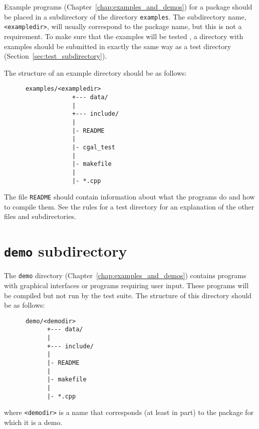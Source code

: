 Example programs (Chapter~\ref{chap:examples_and_demos}) for a package should 
be placed in a subdirectory of the directory {\tt examples}. 
The subdirectory name, \verb|<exampledir>|, will usually correspond to the 
package name, but this is not a requirement.
To make sure that the examples will be tested%
, 
a directory with examples 
should be submitted in exactly the same way as a test directory 
(Section~\ref{sec:test_subdirectory}). 

The structure of an example directory should be as follows: 
\begin{verbatim}
      examples/<exampledir>
                   +--- data/
                   |
                   +--- include/
                   |
                   |- README
                   |
                   |- cgal_test
                   |
                   |- makefile
                   |
                   |- *.cpp
\end{verbatim}

The file {\tt README} should contain information about what the programs do
and how to compile them. 
See the rules for a test directory for an explanation of the other files 
and subdirectories. 

\section{{\tt demo} subdirectory}
\label{sec:demo_subdirectory}

The {\tt demo} directory (Chapter~\ref{chap:examples_and_demos}) contains 
programs with graphical interfaces or programs requiring user input. These 
programs will be compiled but not run by the test suite.
The structure of this directory should be as follows: 
\begin{verbatim}
      demo/<demodir>
            +--- data/
            |
            +--- include/
            |
            |- README
            |
            |- makefile
            |
            |- *.cpp
\end{verbatim}
where \verb|<demodir>| is a name that corresponds (at least in part) to
the package for which it is a demo.

